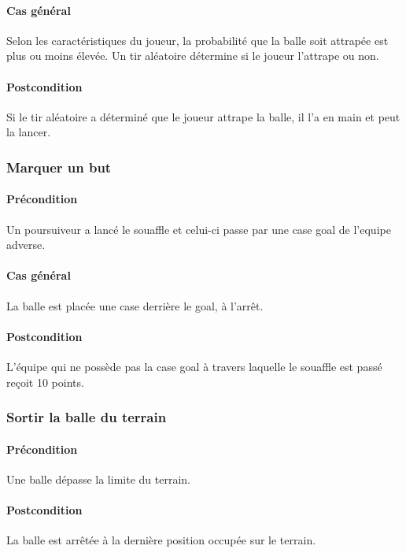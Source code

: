     \paragraph{Cas général} Selon les caractéristiques du joueur, la probabilité que la balle soit attrapée est plus ou moins élevée. Un tir aléatoire détermine si le joueur l'attrape ou non.
    \paragraph{Postcondition} Si le tir aléatoire a déterminé que le joueur attrape la balle, il l'a en main et peut la lancer.

\subsubsection{Marquer un but}
    \paragraph{Précondition} Un \gls{poursuiveur} a lancé le souaffle et celui-ci passe par une case goal de l'\gls{equipe} adverse. 
    \paragraph{Cas général} La balle est placée une case derrière le goal, à l'arrêt.
    \paragraph{Postcondition} L'équipe qui ne possède pas la case goal à travers laquelle le souaffle est passé reçoit 10 points.

\subsubsection{Sortir la balle du terrain}
    \paragraph{Précondition} Une balle dépasse la limite du terrain.
    \paragraph{Postcondition} La balle est arrêtée à la dernière position occupée sur le terrain.
